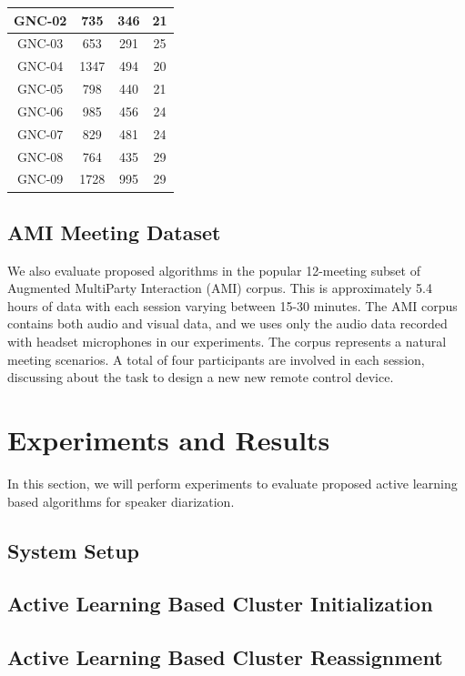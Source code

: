 \documentclass[journal]{IEEEtran}
\begin{document}
\begin{table}[t]
\begin{tabular}{|c|c|c|c|}
GNC-02       & 735              & 346             & 21           \\ \hline
GNC-03       & 653              & 291             & 25           \\ \hline
GNC-04       & 1347             & 494             & 20           \\ \hline
GNC-05       & 798              & 440             & 21           \\ \hline
GNC-06       & 985              & 456             & 24           \\ \hline
GNC-07       & 829              & 481             & 24           \\ \hline
GNC-08       & 764              & 435             & 29           \\ \hline
GNC-09       & 1728             & 995             & 29           \\ \hline
\end{tabular}
\end{table}

\subsection{AMI Meeting Dataset}
We also evaluate proposed algorithms in the popular 12-meeting subset of Augmented MultiParty Interaction (AMI) corpus. This is approximately 5.4 hours of data with each session varying between 15-30 minutes. The AMI corpus contains both audio and visual data, and we uses only the audio data recorded with headset microphones in our experiments. The corpus represents a natural meeting scenarios. A total of four participants are involved in each session, discussing about the task to design a new new remote control device.  

\section{Experiments and Results}
In this section, we will perform experiments to evaluate proposed active learning based algorithms for speaker diarization. 
\subsection{System Setup}
\subsection{Active Learning Based Cluster Initialization}
\subsection{Active Learning Based Cluster Reassignment}
\end{document}

